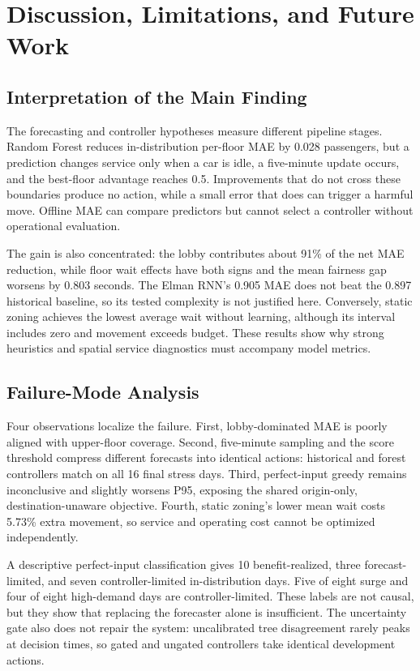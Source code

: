 \documentclass[12pt]{article}
\begin{document}
\section{Discussion, Limitations, and Future Work}
\label{sec:discussion}

\subsection{Interpretation of the Main Finding}

The forecasting and controller hypotheses measure different pipeline stages.
Random Forest reduces in-distribution per-floor MAE by 0.028 passengers, but a
prediction changes service only when a car is idle, a five-minute update occurs,
and the best-floor advantage reaches 0.5. Improvements that do not cross these
boundaries produce no action, while a small error that does can trigger a
harmful move. Offline MAE can compare predictors but cannot select a controller
without operational evaluation.

The gain is also concentrated: the lobby contributes about 91\% of the net MAE
reduction, while floor wait effects have both signs and the mean fairness gap
worsens by 0.803 seconds. The Elman RNN's 0.905 MAE does not beat the 0.897
historical baseline, so its tested complexity is not justified here. Conversely,
static zoning achieves the lowest average wait without learning, although its
interval includes zero and movement exceeds budget. These results show why
strong heuristics and spatial service diagnostics must accompany model metrics.

\subsection{Failure-Mode Analysis}

Four observations localize the failure. First, lobby-dominated MAE is poorly
aligned with upper-floor coverage. Second, five-minute sampling and the score
threshold compress different forecasts into identical actions: historical and
forest controllers match on all 16 final stress days. Third, perfect-input
greedy remains inconclusive and slightly worsens P95, exposing the shared
origin-only, destination-unaware objective. Fourth, static zoning's lower mean
wait costs 5.73\% extra movement, so service and operating cost cannot be
optimized independently.

A descriptive perfect-input classification gives 10 benefit-realized, three
forecast-limited, and seven controller-limited in-distribution days. Five of
eight surge and four of eight high-demand days are controller-limited. These
labels are not causal, but they show that replacing the forecaster alone is
insufficient. The uncertainty gate also does not repair the system: uncalibrated
tree disagreement rarely peaks at decision times, so gated and ungated
controllers take identical development actions.
\end{document}
